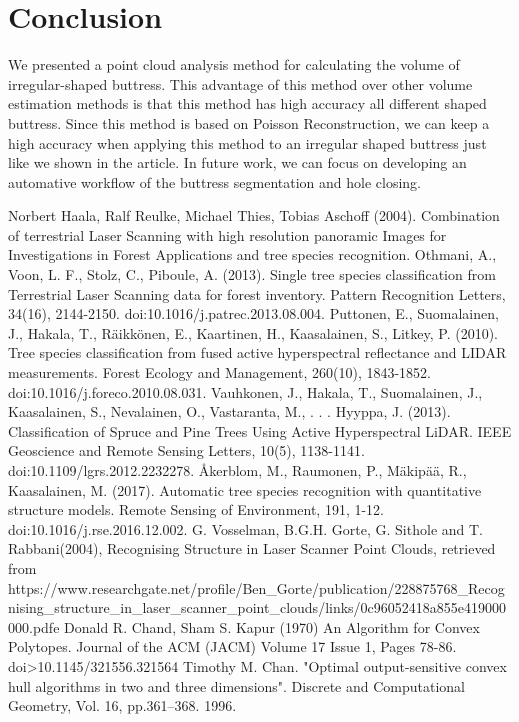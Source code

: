 \documentclass[runningheads,a4paper]{llncs}
\begin{document}
\section{Conclusion}
We presented a point cloud analysis method for calculating the volume of irregular-shaped buttress. This advantage of this method over other volume estimation methods is that this method has high accuracy all different shaped buttress. Since this method is based on Poisson Reconstruction, we can keep a high accuracy when applying this method to an irregular shaped buttress just like we shown in the article. In future work, we can focus on developing an automative workflow of the buttress segmentation and hole closing.
\newpage
\begin{thebibliography}{4}
Norbert Haala, Ralf Reulke, Michael Thies, Tobias Aschoff (2004). Combination of terrestrial Laser Scanning with high resolution panoramic Images for Investigations in Forest Applications and tree species recognition.
Othmani, A., Voon, L. F., Stolz, C., Piboule, A. (2013). Single tree species classification from Terrestrial Laser Scanning data for forest inventory. Pattern Recognition Letters, 34(16), 2144-2150. doi:10.1016/j.patrec.2013.08.004.
Puttonen, E., Suomalainen, J., Hakala, T., Räikkönen, E., Kaartinen, H., Kaasalainen, S., Litkey, P. (2010). Tree species classification from fused active hyperspectral reflectance and LIDAR measurements. Forest Ecology and Management, 260(10), 1843-1852. doi:10.1016/j.foreco.2010.08.031.
Vauhkonen, J., Hakala, T., Suomalainen, J., Kaasalainen, S., Nevalainen, O., Vastaranta, M., . . . Hyyppa, J. (2013). Classification of Spruce and Pine Trees Using Active Hyperspectral LiDAR. IEEE Geoscience and Remote Sensing Letters, 10(5), 1138-1141. doi:10.1109/lgrs.2012.2232278.
Åkerblom, M., Raumonen, P., Mäkipää, R., Kaasalainen, M. (2017). Automatic tree species recognition with quantitative structure models. Remote Sensing of Environment, 191, 1-12. doi:10.1016/j.rse.2016.12.002.
G. Vosselman, B.G.H. Gorte, G. Sithole and T. Rabbani(2004), Recognising Structure in Laser Scanner Point Clouds, retrieved from https://www.researchgate.net/profile/Ben\_Gorte/publication/228875768\_Recognising\_structure\_in\_laser\_scanner\_point\_clouds/links/0c96052418a855e419000000.pdfe
Donald R. Chand, Sham S. Kapur (1970) An Algorithm for Convex Polytopes. Journal of the ACM (JACM) Volume 17 Issue 1, Pages 78-86. doi>10.1145/321556.321564
Timothy M. Chan. "Optimal output-sensitive convex hull algorithms in two and three dimensions". Discrete and Computational Geometry, Vol. 16, pp.361–368. 1996.

\end{thebibliography}
\end{document}
